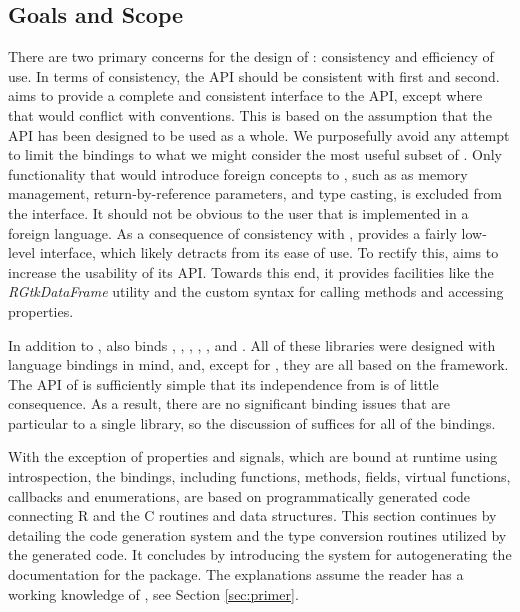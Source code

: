 \documentclass[article]{jss}
\begin{document}
\subsection{Goals and Scope}

There are two primary concerns for the design of :
consistency
and efficiency of use. In terms of consistency, the API should be
consistent 
with  first and  second.  aims to
provide a 
complete and consistent interface to the  API, except where
that would
conflict with  conventions. This is based on the
assumption that the
 API has been designed to be used as a whole. We
purposefully avoid 
any attempt to limit the bindings to what we might consider the most
useful 
subset of . Only functionality that would introduce foreign
concepts
to , such as as memory management, return-by-reference
parameters, 
and type casting, is excluded from the  interface. It
should not be
obvious to the user that  is implemented in a foreign
language.
As a consequence of consistency with ,  provides
a fairly 
low-level interface, which likely detracts from its ease of use. To
rectify
this,  aims to increase the usability of its API. 
Towards this end, it provides facilities like the \emph{RGtkDataFrame}
utility 
and the custom syntax for calling methods and accessing properties. 

In addition to ,  also binds
, , , , , and
.
All of these libraries were designed with language bindings in mind,
and, except
for , they are all based on the  framework.
The API of
 is sufficiently simple that its independence from
 is
of little consequence. As a result, there are no significant binding
issues that
are particular to a single library, so the discussion of 
suffices
for all of the bindings. 

With the exception of properties and signals, which are bound at
runtime using introspection, the  bindings, including
functions, methods, fields, virtual functions, callbacks and
enumerations, are based on programmatically generated code connecting
R and the C routines and data structures.  This section continues by
detailing the code
generation system and the type conversion routines utilized by the
generated code. It concludes by introducing the system for
autogenerating the  documentation for the package. The
explanations assume the reader has a working knowledge of
, see Section \ref{sec:primer}.
\end{document}
